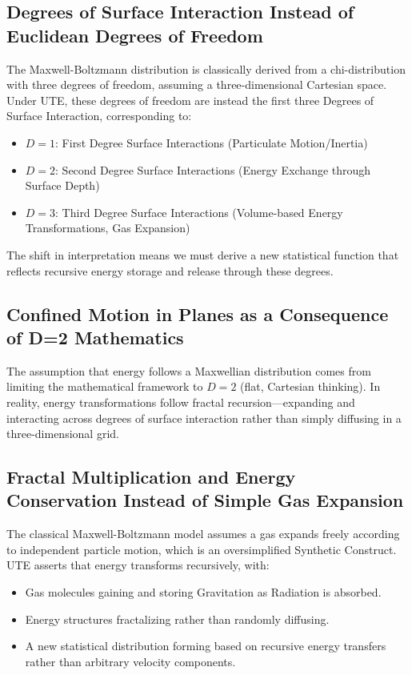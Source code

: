 \documentclass{article}
\begin{document}
\subsection{Degrees of Surface Interaction Instead of Euclidean Degrees of Freedom}
The Maxwell-Boltzmann distribution is classically derived from a chi-distribution with three degrees of freedom, assuming a three-dimensional Cartesian space. Under UTE, these degrees of freedom are instead the first three Degrees of Surface Interaction, corresponding to:
\begin{itemize}
    \item \( D=1 \): First Degree Surface Interactions (Particulate Motion/Inertia)
    \item \( D=2 \): Second Degree Surface Interactions (Energy Exchange through Surface Depth)
    \item \( D=3 \): Third Degree Surface Interactions (Volume-based Energy Transformations, Gas Expansion)
\end{itemize}
The shift in interpretation means we must derive a new statistical function that reflects recursive energy storage and release through these degrees.

\subsection{Confined Motion in Planes as a Consequence of D=2 Mathematics}
The assumption that energy follows a Maxwellian distribution comes from limiting the mathematical framework to \( D=2 \) (flat, Cartesian thinking). In reality, energy transformations follow fractal recursion—expanding and interacting across degrees of surface interaction rather than simply diffusing in a three-dimensional grid.

\subsection{Fractal Multiplication and Energy Conservation Instead of Simple Gas Expansion}
The classical Maxwell-Boltzmann model assumes a gas expands freely according to independent particle motion, which is an oversimplified Synthetic Construct. UTE asserts that energy transforms recursively, with:
\begin{itemize}
    \item Gas molecules gaining and storing Gravitation as Radiation is absorbed.
    \item Energy structures fractalizing rather than randomly diffusing.
    \item A new statistical distribution forming based on recursive energy transfers rather than arbitrary velocity components.
\end{itemize}
\end{document}
